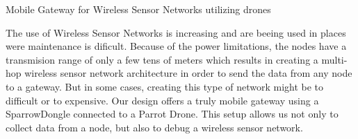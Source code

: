 Mobile Gateway for Wireless Sensor Networks utilizing drones

The use of Wireless Sensor Networks is increasing and are beeing used in places were maintenance is dificult. Because of the power limitations, the nodes have a transmision range of only a few tens of meters which results in creating a multi-hop wireless sensor network architecture in order to send the data from any node to a gateway. But in some cases, creating this type of network might be to difficult or to expensive. Our design offers a truly mobile gateway using a SparrowDongle connected to a Parrot Drone. This setup allows us not only to collect data from a node, but also to debug a wireless sensor network.
